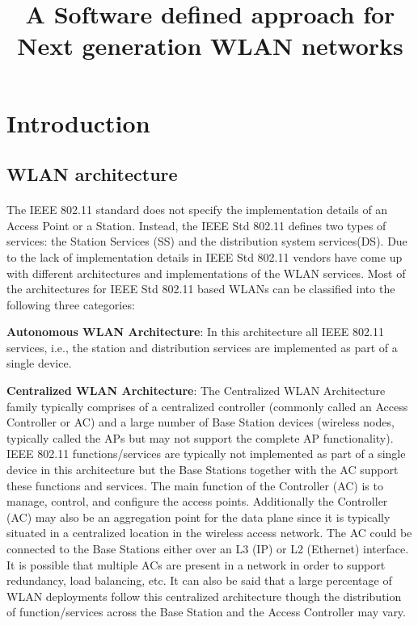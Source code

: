 \documentclass[12pt]{article}
\begin{document}
\title{A Software defined approach for Next generation WLAN networks}

	
\section{Introduction}
\subsection{WLAN architecture}
\paragraph{}
The IEEE 802.11 standard does not specify the implementation details of an Access Point or a Station. Instead, the IEEE Std 802.11 defines two types of services: the Station Services (SS) and the distribution system services(DS). Due to the lack of implementation details in IEEE Std 802.11 vendors have come up with different architectures and implementations of the WLAN services. Most of the architectures for IEEE Std 802.11 based WLANs can be classified into the following three categories: 

 

    \textbf{Autonomous WLAN Architecture}: In this architecture all IEEE 802.11 services, i.e., the station and distribution services are implemented as part of a single device.  

    \textbf{Centralized WLAN Architecture}: The Centralized WLAN Architecture family typically comprises of a centralized controller (commonly called an Access Controller or AC) and a large number of Base Station devices (wireless nodes, typically called the APs but may not support the complete AP functionality). IEEE 802.11 functions/services are typically not implemented as part of a single device in this architecture but the Base Stations together with the AC support these functions and services. The main function of the Controller (AC) is to manage, control, and configure the access points. Additionally the Controller (AC) may also be an aggregation point for the data plane since it is typically situated in a centralized location in the wireless access network. The AC could be connected to the Base Stations either over an L3 (IP) or L2 (Ethernet) interface. It is possible that multiple ACs are present in a network in order to support redundancy, load balancing, etc. It can also be said that a large percentage of WLAN deployments follow this centralized architecture though the distribution of function/services across the Base Station and the Access Controller may vary. 
\end{document}
